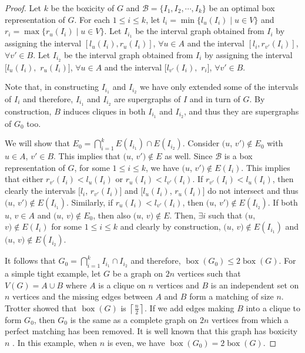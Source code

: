 \begin{proof}
 Let $k$ be the boxicity of $G$ and $\mathcal{B}=\{I_1, I_2, \cdots, I_k\}$ be an optimal box representation of $G$. For each $1 \le i \le k$, let $l_i = \min\{l_u(I_i)\mid u\in V \}$ and $r_i = \max\{r_u(I_i) \mid u\in V\}$. Let $I_{i_1}$ be the interval graph obtained from $I_i$ by assigning the interval $\left[l_u(I_{i}), r_u(I_{i})\right]$, $\forall u \in A$ and the interval $\left[l_i, r_{v'}(I_{i})\right]$, $\forall v' \in B$. Let $I_{i_2}$ be the interval graph obtained from $I_i$ by assigning the interval $\bigl[l_u(I_{i}),$ $r_u(I_{i})\bigr]$, $\forall u \in A$ and the interval  $\bigl[l_{v'}(I_{i}),$ $r_i\bigr]$, $\forall v' \in B$.

  Note that, in constructing $I_{i_1}$ and  $I_{i_2}$ we have only extended some of the intervals of $I_i$ and therefore, $I_{i_1}$ and  $I_{i_2}$ are supergraphs of $I$ and in turn of $G$. By construction, $B$ induces cliques in both  $I_{i_1}$ and  $I_{i_2}$, and thus they are supergraphs of $G_0$ too. 

 We will show that $E_0=\bigcap_{i=1}^{k}{E(I_{i_1}) \cap E(I_{i_2})}$. Consider $(u$, $v') \notin E_0$ with $u \in A$, $v' \in B$. This implies that $(u$, $v') \notin E$ as well. Since $\mathcal{B}$ is a box representation of $G$, for some $1 \le i \le k$, we have $(u$, $v') \notin E(I_i)$. This implies that either $r_{v'}(I_i) < l_u(I_i)$ or $r_u(I_i) < l_{v'}(I_i)$. If $r_{v'}(I_i) < l_u(I_i)$, then clearly the intervals $[l_i$, $r_{v'}(I_i)]$ and $[l_u(I_i)$, $r_u(I_i)]$ do not intersect and thus $(u$, $v') \notin E(I_{i_1})$. Similarly, if $r_u(I_i) < l_{v'}(I_i)$, then $(u$, $v') \notin E(I_{i_2})$. If both $u$, $v \in A$ and $(u$, $v) \notin E_0$, then also $(u$, $v) \notin E$. Then, $\exists i$ such that $(u$, $v) \notin E(I_i)$ for some $1\le i\le k$ and clearly by construction, $(u$, $v) \notin E(I_{i_1})$ and  $(u$, $v) \notin E(I_{i_2})$.

  It follows that $G_0=\bigcap_{i=1}^{k}{I_{i_1} \cap I_{i_2}}$ and therefore, $\operatorname{box}(G_0) \le 2 \operatorname{box}(G)$. 
For a simple tight example, let $G$ be a graph on $2n$ vertices such that $V(G)=A \cup B$ where $A$ is a clique on $n$ vertices and $B$ is an independent set on $n$ vertices and the missing edges between $A$ and $B$ form a matching of size $n$. Trotter \cite{Trotter79} showed that $\operatorname{box}(G)$ is $\left \lceil \frac{n}{2}\right\rceil$. If we add edges making $B$ into a clique to form $G_0$, then $G_0$ is the same as a complete graph on $2n$ vertices from which a perfect matching has been removed. It is well known that this graph has boxicity $n$ \cite{Trotter79}. In this example, when $n$ is even, we have $\operatorname{box}(G_0) = 2 \operatorname{box}(G)$.                                                    
\end{proof}
